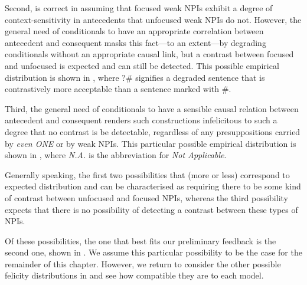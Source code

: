 Second, \textcite{Crnic2014-dogma} is correct in assuming that focused weak NPIs exhibit a degree of context-sensitivity in antecedents that unfocused weak NPIs do not. However, the general need of conditionals to have an appropriate correlation between antecedent and consequent masks this fact---to an extent---by degrading conditionals without an appropriate causal link, but a contrast between focused and unfocused is expected and can still be detected. This possible empirical distribution is shown in , where ?\# signifies a degraded sentence that is contrastively more acceptable than a sentence marked with \#.
\begin{table}[!htb]
\end{table}

Third, the general need of conditionals to have a sensible causal relation between antecedent and consequent renders such constructions infelicitous to such a degree that no contrast is be detectable, regardless of any presuppositions carried by \textit{even \MakeUppercase{one}} or by weak NPIs. This particular possible empirical distribution is shown in , where \textit{N.A.} is the abbreviation for \textit{Not Applicable}.
\begin{table}[!htb]
\end{table}

Generally speaking, the first two possibilities that (more or less) correspond to  expected distribution and can be characterised as requiring there to be some kind of contrast between unfocused and focused NPIs, whereas the third possibility expects that there is no possibility of detecting a contrast between these types of NPIs.

Of these possibilities, the one that best fits our preliminary feedback is the second one, shown in . We assume this particular possibility to be the case for the remainder of this chapter. However, we return to consider the other possible felicity distributions in  and see how compatible they are to each model.

